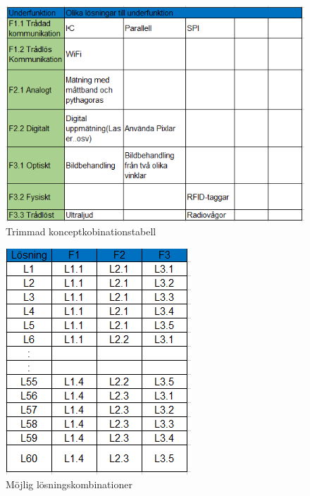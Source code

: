 \documentclass[11pt, a4paper]{report}
\begin{document}
\begin{figure}[H]
	\begin{center}
		\includegraphics [width=12cm,angle=0]{trimmadtabell.png}
		\caption{Trimmad konceptkobinationstabell }
		\label{fig:koncepttabell2}
	\end{center}
\end{figure}

\begin{figure}[H]
	\begin{center}
		\includegraphics [angle=0]{Losningsforslag.png}
		\caption{Möjlig lösningskombinationer }
		\label{fig:mojligalosningar}
	\end{center}
\end{figure}
\end{document}
